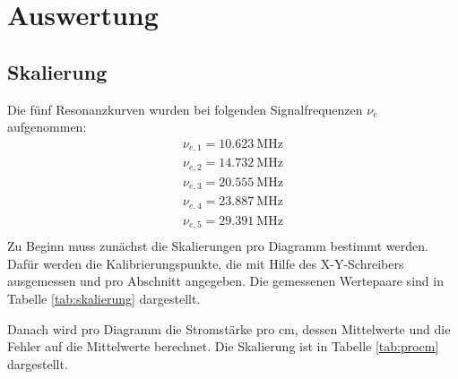 \section{Auswertung}
\subsection{Skalierung}
Die fünf Resonanzkurven wurden bei folgenden Signalfrequenzen $\nu_e$ aufgenommen:
\begin{align*}
  \nu_{e, 1} = \SI{10.623}{\mega\hertz} \\
  \nu_{e, 2} = \SI{14.732}{\mega\hertz} \\
  \nu_{e, 3} = \SI{20.555}{\mega\hertz} \\
  \nu_{e, 4} = \SI{23.887}{\mega\hertz} \\
  \nu_{e, 5} = \SI{29.391}{\mega\hertz} \\
\end{align*}
Zu Beginn muss zunächst die Skalierungen pro Diagramm bestimmt werden. Dafür
werden die Kalibrierungspunkte, die mit Hilfe des X-Y-Schreibers ausgemessen
und pro Abschnitt angegeben. Die gemessenen Wertepaare sind in Tabelle
\ref{tab:skalierung} dargestellt.


Danach wird pro Diagramm die Stromstärke pro $\si{\centi\meter}$, dessen
Mittelwerte und die Fehler auf die Mittelwerte berechnet. Die Skalierung ist
in Tabelle \ref{tab:procm} dargestellt.


